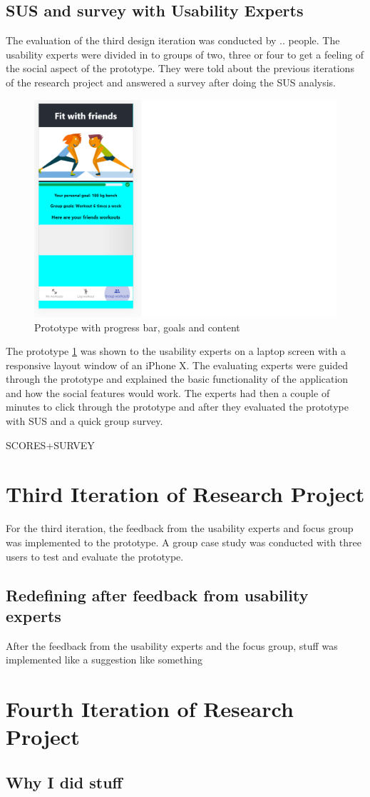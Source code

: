 \subsection{SUS and survey with Usability Experts}
The evaluation of the third design iteration was conducted by .. people. The usability experts were divided in to groups of two, three or four to get a feeling of the social aspect of the prototype. They were told about the previous iterations of the research project and answered a survey after doing the SUS analysis.
\begin{figure}[H]
    \centering
    \includegraphics[scale=0.6]{figures/GruppeAspekt1.png}
    \caption{Prototype with progress bar, goals and content}
    \label{GruppeAss1}
\end{figure}

The prototype \ref{GruppeAss1} was shown to the usability experts on a laptop screen with a responsive layout window of an iPhone X. The evaluating experts were guided through the prototype and explained the basic functionality of the application and how the social features would work. The experts had then a couple of minutes to click through the prototype and after they evaluated the prototype with SUS and a quick group survey.

SCORES+SURVEY




\section{Third Iteration of Research Project}
For the third iteration, the feedback from the usability experts and focus group was implemented to the prototype. A group case study was conducted with three users to test and evaluate the prototype.
\subsection{Redefining after feedback from usability experts}
After the feedback from the usability experts and the focus group, stuff was implemented like a suggestion like something 

\section{Fourth Iteration of Research Project}
\subsection{Why I did stuff}
